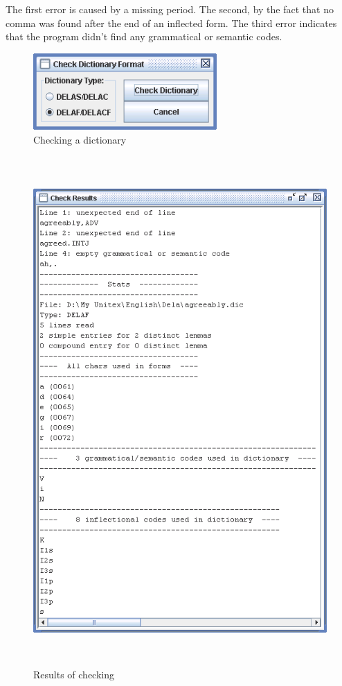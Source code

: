 \bigskip
\noindent The first error is caused by a missing period. The second, by the fact
that no comma was found after the end of an inflected form. The third error indicates
that the program didn't find any grammatical or semantic codes.



\begin{figure}[!h]
\begin{center}
\includegraphics[width=7cm]{resources/img/fig3-5.png}
\caption{Checking a dictionary\label{fig-dictionary-checking}}
\end{center}
\end{figure}

\begin{figure}[!p]
\begin{center}
\includegraphics[height=19.4cm]{resources/img/fig3-6.png}
\caption{Results of checking\label{fig-dictionary-checking-results}}
\end{center}
\end{figure}


